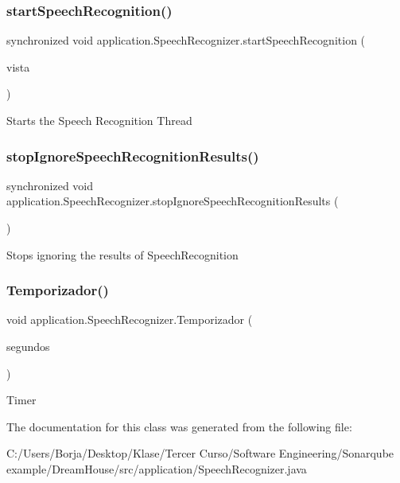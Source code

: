 \subsubsection{\texorpdfstring{start\+Speech\+Recognition()}{startSpeechRecognition()}}
{\footnotesize\ttfamily synchronized void application.\+Speech\+Recognizer.\+start\+Speech\+Recognition (\begin{DoxyParamCaption}\item[{\mbox{\hyperlink{classvista_1_1_ventana_principal}{Ventana\+Principal}}}]{vista }\end{DoxyParamCaption})}

Starts the Speech Recognition Thread \mbox{\label{classapplication_1_1_speech_recognizer_a6c9ee420dd7fcf9b6aeda63361b0c819}} 
\subsubsection{\texorpdfstring{stop\+Ignore\+Speech\+Recognition\+Results()}{stopIgnoreSpeechRecognitionResults()}}
{\footnotesize\ttfamily synchronized void application.\+Speech\+Recognizer.\+stop\+Ignore\+Speech\+Recognition\+Results (\begin{DoxyParamCaption}{ }\end{DoxyParamCaption})}

Stops ignoring the results of Speech\+Recognition \mbox{\label{classapplication_1_1_speech_recognizer_a52344e31f4d4cec33c0713387a10c235}} 
\subsubsection{\texorpdfstring{Temporizador()}{Temporizador()}}
{\footnotesize\ttfamily void application.\+Speech\+Recognizer.\+Temporizador (\begin{DoxyParamCaption}\item[{int}]{segundos }\end{DoxyParamCaption})}

Timer 

The documentation for this class was generated from the following file\+:\begin{DoxyCompactItemize}
\item 
C\+:/\+Users/\+Borja/\+Desktop/\+Klase/\+Tercer Curso/\+Software Engineering/\+Sonarqube example/\+Dream\+House/src/application/Speech\+Recognizer.\+java\end{DoxyCompactItemize}
